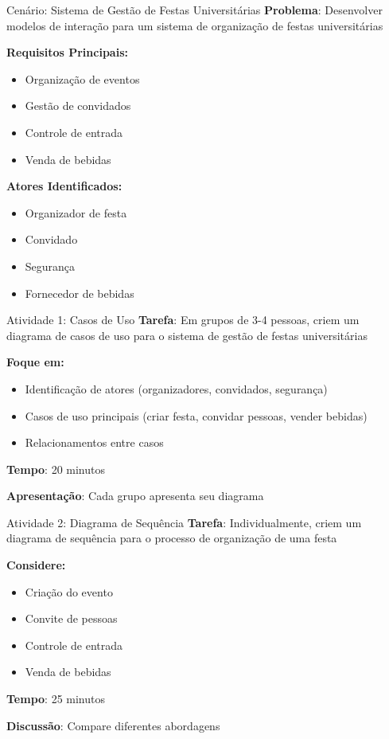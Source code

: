 \documentclass[aspectratio=169]{beamer}
\begin{document}
\begin{frame}{Cenário: Sistema de Gestão de Festas Universitárias}
\textbf{Problema}: Desenvolver modelos de interação para um sistema de organização de festas universitárias

\textbf{Requisitos Principais:}
\begin{itemize}
\item Organização de eventos
\item Gestão de convidados
\item Controle de entrada
\item Venda de bebidas
\end{itemize}

\vspace{0.5cm}
\textbf{Atores Identificados:}
\begin{itemize}
\item Organizador de festa
\item Convidado
\item Segurança
\item Fornecedor de bebidas
\end{itemize}
\end{frame}

\begin{frame}{Atividade 1: Casos de Uso}
\textbf{Tarefa}: Em grupos de 3-4 pessoas, criem um diagrama de casos de uso para o sistema de gestão de festas universitárias

\textbf{Foque em:}
\begin{itemize}
\item Identificação de atores (organizadores, convidados, segurança)
\item Casos de uso principais (criar festa, convidar pessoas, vender bebidas)
\item Relacionamentos entre casos
\end{itemize}

\vspace{0.5cm}
\textbf{Tempo}: 20 minutos

\vspace{0.5cm}
\textbf{Apresentação}: Cada grupo apresenta seu diagrama
\end{frame}

\begin{frame}{Atividade 2: Diagrama de Sequência}
\textbf{Tarefa}: Individualmente, criem um diagrama de sequência para o processo de organização de uma festa

\textbf{Considere:}
\begin{itemize}
\item Criação do evento
\item Convite de pessoas
\item Controle de entrada
\item Venda de bebidas
\end{itemize}

\vspace{0.5cm}
\textbf{Tempo}: 25 minutos

\vspace{0.5cm}
\textbf{Discussão}: Compare diferentes abordagens
\end{frame}
\end{document}
